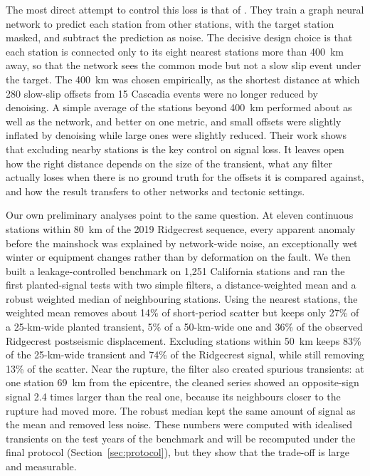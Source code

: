 \documentclass[11pt,a4paper]{article}
\begin{document}
The most direct attempt to control this loss is that of \citet{bachelot2025}. They train a graph neural network to predict each station from other stations, with the target station masked, and subtract the prediction as noise. The decisive design choice is that each station is connected only to its eight nearest stations more than 400~km away, so that the network sees the common mode but not a slow slip event under the target. The 400~km was chosen empirically, as the shortest distance at which 280 slow-slip offsets from 15 Cascadia events were no longer reduced by denoising. A simple average of the stations beyond 400~km performed about as well as the network, and better on one metric, and small offsets were slightly inflated by denoising while large ones were slightly reduced. Their work shows that excluding nearby stations is the key control on signal loss. It leaves open how the right distance depends on the size of the transient, what any filter actually loses when there is no ground truth for the offsets it is compared against, and how the result transfers to other networks and tectonic settings.

Our own preliminary analyses point to the same question. At eleven continuous stations within 80~km of the 2019 Ridgecrest sequence, every apparent anomaly before the mainshock was explained by network-wide noise, an exceptionally wet winter or equipment changes rather than by deformation on the fault. We then built a leakage-controlled benchmark on 1,251 California stations and ran the first planted-signal tests with two simple filters, a distance-weighted mean and a robust weighted median of neighbouring stations. Using the nearest stations, the weighted mean removes about 14\% of short-period scatter but keeps only 27\% of a 25-km-wide planted transient, 5\% of a 50-km-wide one and 36\% of the observed Ridgecrest postseismic displacement. Excluding stations within 50~km keeps 83\% of the 25-km-wide transient and 74\% of the Ridgecrest signal, while still removing 13\% of the scatter. Near the rupture, the filter also created spurious transients: at one station 69~km from the epicentre, the cleaned series showed an opposite-sign signal 2.4 times larger than the real one, because its neighbours closer to the rupture had moved more. The robust median kept the same amount of signal as the mean and removed less noise. These numbers were computed with idealised transients on the test years of the benchmark and will be recomputed under the final protocol (Section~\ref{sec:protocol}), but they show that the trade-off is large and measurable.
\end{document}
